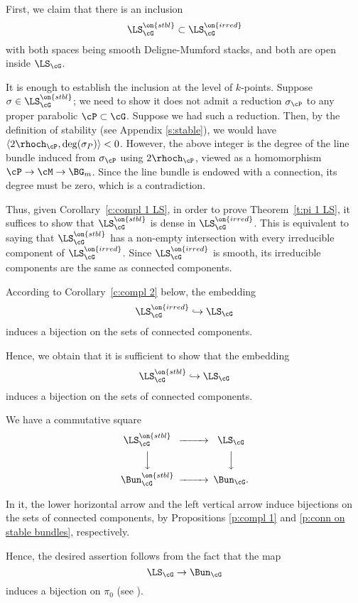\documentclass[9pt]{amsart}
\theoremstyle{remark}
\theoremstyle{definition}
\theoremstyle{remark}
\newcommand{\thmref}[1]{Theorem~\ref{#1}}
\newcommand{\corref}[1]{Corollary~\ref{#1}}
\numberwithin{equation}{section}
\begin{document}
First, we claim that there is an inclusion 
$$\LS_\cG^{\on{stbl}}\subset \LS_\cG^{\on{irred}}$$
with both spaces being smooth Deligne-Mumford stacks, and both are open inside $\LS_\cG$.

\medskip

It is enough to establish the inclusion at the level of $k$-points. 
Suppose $\sigma \in \LS_\cG^{\on{stbl}}$; we need to show it
does not admit a reduction $\sigma_\cP$ to any proper parabolic $\cP \subset \cG$. 
Suppose we had such a reduction. Then, by the definition of stability (see Appendix \ref{s:stable}), 
we would have $\langle 2\rhoch_\cP,\deg(\sigma_P)\rangle<0$. However, the above integer is the degree
of the line bundle induced from $\sigma_\cP$ using $2\rhoch_\cP$, viewed as a homomorphism
$\cP \to \cM \to \BG_m$. Since the line bundle is endowed with a connection, its degree must be zero,
which is a contradiction. 

\medskip

Thus, given \corref{c:compl 1 LS}, in order to prove \thmref{t:pi 1 LS}, it suffices to show that
$\LS_\cG^{\on{stbl}}$ is dense in $\LS_\cG^{\on{irred}}$. This is equivalent to saying that 
$\LS_\cG^{\on{stbl}}$ has a non-empty intersection with every irreducible component 
of $\LS_\cG^{\on{irred}}$. Since $\LS_\cG^{\on{irred}}$ is smooth, its irreducible components
are the same as connected components. 

\medskip

According to \corref{c:compl 2} below, the embedding  
$$\LS^{\on{irred}}_\cG\hookrightarrow \LS_\cG$$
induces a bijection on the sets of connected components. 

\medskip

Hence, we obtain that it is sufficient to show that the embedding
$$\LS_\cG^{\on{stbl}}\hookrightarrow \LS_\cG$$
induces a bijection on the sets of connected components. 

\medskip

We have a commutative square
$$
\CD
\LS^{\on{stbl}}_\cG @>>>  \LS_\cG \\
@VVV @VVV \\
\Bun^{\on{stbl}}_\cG @>>>  \Bun_\cG.
\endCD
$$

In it, the lower horizontal arrow and the left vertical arrow induce 
bijections on the sets of connected components, by Propositions
\ref{p:compl 1} and \ref{p:conn on stable bundles}, respectively.

\medskip

Hence, the desired assertion follows from the fact that the map
$$\LS_\cG \to \Bun_\cG$$
induces a bijection on $\pi_0$ (see \cite[Proposition 2.11.4]{BD}). 
\end{document}
